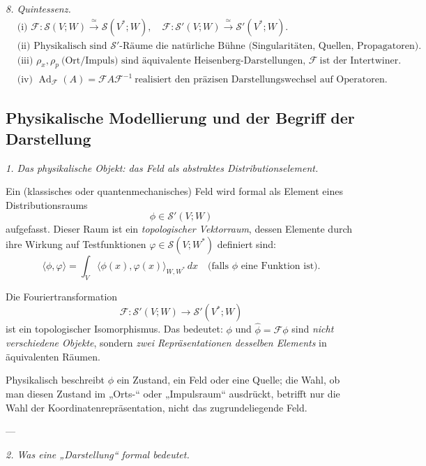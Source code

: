\documentclass[10pt, letterpaper]{article}
\newcommand{\Ad}{\operatorname{Ad}}
\begin{document}
\bigskip

\emph{8. Quintessenz.}
\[
\boxed{
\begin{aligned}
&\text{(i) } \mathcal{F}: \mathcal{S}(V;W)\!\xrightarrow{\ \simeq\ }\!\mathcal{S}(V^\ast;W),\quad
\mathcal{F}: \mathcal{S}'(V;W)\!\xrightarrow{\ \simeq\ }\!\mathcal{S}'(V^\ast;W).\\[2pt]
&\text{(ii) } \text{Physikalisch sind } \mathcal{S}'\text{-Räume die natürliche Bühne (Singularitäten, Quellen, Propagatoren).}\\[2pt]
&\text{(iii) } \rho_x,\rho_p\ \text{(Ort/Impuls) sind äquivalente Heisenberg-Darstellungen, } \mathcal{F}\ \text{ist der Intertwiner}.\\[2pt]
&\text{(iv) } \Ad_{\mathcal{F}}(A)=\mathcal{F}A\mathcal{F}^{-1}\ \text{realisiert den präzisen Darstellungswechsel auf Operatoren.}
\end{aligned}
}
\]




\subsection{Physikalische Modellierung und der Begriff der Darstellung}

\emph{1. Das physikalische Objekt: das Feld als abstraktes Distributionselement.}

Ein (klassisches oder quantenmechanisches) Feld wird formal als Element eines Distributionsraums
\[
\phi\in\mathcal{S}'(V;W)
\]
aufgefasst. Dieser Raum ist ein \emph{topologischer Vektorraum}, dessen Elemente durch ihre Wirkung auf Testfunktionen
\(\varphi\in\mathcal{S}(V;W^\ast)\) definiert sind:
\[
\langle \phi, \varphi\rangle = \int_V \langle \phi(x),\varphi(x)\rangle_{W,W^\ast}\,dx
\quad\text{(falls \(\phi\) eine Funktion ist).}
\]

Die Fouriertransformation
\[
\mathcal{F}:\mathcal{S}'(V;W)\to\mathcal{S}'(V^\ast;W)
\]
ist ein topologischer Isomorphismus.  
Das bedeutet: \(\phi\) und \(\widehat{\phi}=\mathcal{F}\phi\) sind \emph{nicht verschiedene Objekte},  
sondern \emph{zwei Repräsentationen desselben Elements} in äquivalenten Räumen.

Physikalisch beschreibt \(\phi\) ein Zustand, ein Feld oder eine Quelle;  
die Wahl, ob man diesen Zustand im „Orts-“ oder „Impulsraum“ ausdrückt,  
betrifft nur die Wahl der Koordinatenrepräsentation, nicht das zugrundeliegende Feld.

---

\emph{2. Was eine „Darstellung“ formal bedeutet.}
\end{document}
